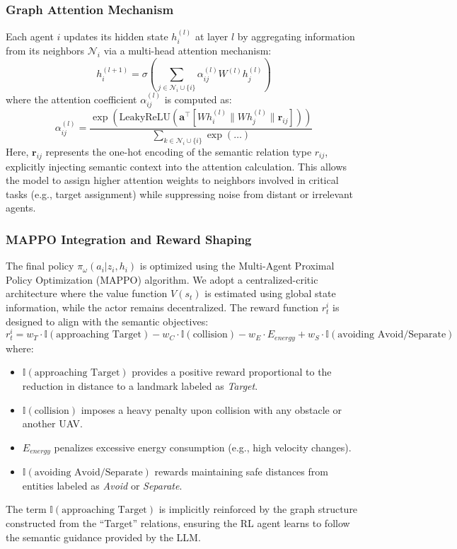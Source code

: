 \documentclass[conference]{IEEEtran}
\begin{document}
\subsubsection{Graph Attention Mechanism}
Each agent $i$ updates its hidden state $h_i^{(l)}$ at layer $l$ by aggregating information from its neighbors $\mathcal{N}_i$ via a multi-head attention mechanism:
\begin{equation}
    h_i^{(l+1)} = \sigma \left( \sum_{j \in \mathcal{N}_i \cup \{i\}} \alpha_{ij}^{(l)} W^{(l)} h_j^{(l)} \right)
\end{equation}
where the attention coefficient $\alpha_{ij}^{(l)}$ is computed as:
\begin{equation}
    \alpha_{ij}^{(l)} = \frac{\exp(\text{LeakyReLU}(\mathbf{a}^\top [W h_i^{(l)} \| W h_j^{(l)} \| \mathbf{r}_{ij}]))}{\sum_{k \in \mathcal{N}_i \cup \{i\}} \exp(\dots)}
\end{equation}
Here, $\mathbf{r}_{ij}$ represents the one-hot encoding of the semantic relation type $r_{ij}$, explicitly injecting semantic context into the attention calculation. This allows the model to assign higher attention weights to neighbors involved in critical tasks (e.g., target assignment) while suppressing noise from distant or irrelevant agents.

\subsubsection{MAPPO Integration and Reward Shaping}
The final policy $\pi_\omega(a_i | z_i, h_i)$ is optimized using the Multi-Agent Proximal Policy Optimization (MAPPO) algorithm. We adopt a centralized-critic architecture where the value function $V(s_t)$ is estimated using global state information, while the actor remains decentralized. The reward function $r_t^i$ is designed to align with the semantic objectives:
\begin{equation}
    r_t^i = w_T \cdot \mathbb{I}(\text{approaching Target}) - w_C \cdot \mathbb{I}(\text{collision}) - w_E \cdot E_{energy} + w_S \cdot \mathbb{I}(\text{avoiding Avoid/Separate})
\end{equation}
where:
\begin{itemize}
    \item $\mathbb{I}(\text{approaching Target})$ provides a positive reward proportional to the reduction in distance to a landmark labeled as \textit{Target}.
    \item $\mathbb{I}(\text{collision})$ imposes a heavy penalty upon collision with any obstacle or another UAV.
    \item $E_{energy}$ penalizes excessive energy consumption (e.g., high velocity changes).
    \item $\mathbb{I}(\text{avoiding Avoid/Separate})$ rewards maintaining safe distances from entities labeled as \textit{Avoid} or \textit{Separate}.
\end{itemize}
The term $\mathbb{I}(\text{approaching Target})$ is implicitly reinforced by the graph structure constructed from the ``Target'' relations, ensuring the RL agent learns to follow the semantic guidance provided by the LLM.
\end{document}
